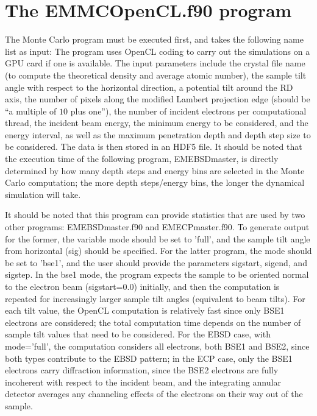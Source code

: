 \documentclass[DIV=calc, paper=letter, fontsize=11pt]{scrartcl}	 %
\begin{document}
\section{The \protect\textsf{EMMCOpenCL.f90} program\label{sec:f90MC}}
The Monte Carlo program must be executed first, and takes the following name list as input:
The program uses OpenCL coding to carry out the simulations on a GPU card if one is available.  The input parameters
include the crystal file name (to compute the theoretical density and average atomic number), the sample
tilt angle with respect to the horizontal direction, a potential tilt around the \textsf{RD} axis, the number of pixels
along the modified Lambert projection edge (should be ``a multiple of $10$ plus one''), the number of incident electrons per computational thread, 
the incident beam energy, the minimum energy to be considered, and the energy interval,
as well as the maximum penetration depth and depth step size to be considered.  The data is then stored in an 
HDF5 file.  It should be noted that the execution time of the 
following program, \textsf{EMEBSDmaster}, is directly determined by how many depth steps and energy bins are selected in the
Monte Carlo computation; the more depth steps/energy bins, the longer the dynamical simulation will take.

It should be noted that this program can provide statistics that are used by two other programs: \textsf{EMEBSDmaster.f90} and
\textsf{EMECPmaster.f90}.  To generate output for the former, the variable \textsf{mode} should be set to \textsf{'full'}, 
and the sample tilt angle from horizontal (\textsf{sig}) should be specified.  For the latter program, the \textsf{mode} should
be set to \textsf{'bse1'}, and the user should provide the parameters \textsf{sigstart}, \textsf{sigend}, and \textsf{sigstep}.  In the 
bse1 mode, the program expects the sample to be oriented normal to the electron beam (\textsf{sigstart=0.0}) initially, and 
then the computation is repeated for increasingly larger sample tilt angles (equivalent to beam tilts).  For each tilt value, the 
OpenCL computation is relatively fast since only BSE1 electrons are considered; the total computation time depends on the 
number of sample tilt values that need to be considered.  For the EBSD case, with \textsf{mode='full'}, the computation 
considers all electrons, both BSE1 and BSE2, since both types contribute to the EBSD pattern; in the ECP case, only the 
BSE1 electrons carry diffraction information, since the BSE2 electrons are fully incoherent with respect to the incident beam,
and the integrating annular detector averages any channeling effects of the electrons on their way out of the sample.
\end{document}
